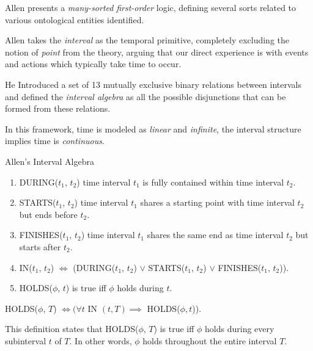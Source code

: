 Allen presents a \textit{many-sorted} \textit{first-order} logic, defining several sorts related to various ontological entities identified.

Allen takes the \textit{interval} as the temporal primitive, completely excluding the notion of \textit{point} from the theory, arguing that our direct experience
is with events and actions which typically take time to occur.

He Introduced a set of 13 mutually exclusive binary relations between intervals and
defined the \textit{interval algebra} as all the possible disjunctions that can be formed from these relations.

In this framework, time is modeled as \textit{linear} and \textit{infinite}, the interval structure implies time is \textit{continuous}.

\begin{exmp} Allen's Interval Algebra

	\begin{enumerate}
		\item DURING($t_1$, $t_2$) time interval $t_1$ is fully contained within time interval $t_2$.

		\item STARTS($t_1$, $t_2$) time interval $t_1$ shares a starting point with time interval $t_2$ but ends before $t_2$.

		\item FINISHES($t_1$, $t_2$) time interval $t_1$ shares the same end as time interval $t_2$ but starts after $t_2$.

		\item IN($t_1$, $t_2$) $\iff$ (DURING($t_1$, $t_2$) $\lor$ STARTS($t_1$, $t_2$) $\lor$ FINISHES($t_1$, $t_2$)).

		\item HOLDS(\(\phi\), \(t\)) is true iff \(\phi\) holds during \(t\).
	\end{enumerate}



	\begin{center}
		HOLDS(\(\phi\), \(T\)) \(\iff ( \forall t \) IN $ (t,T) \implies $ HOLDS($\phi, t$)).
	\end{center}

	This definition states that HOLDS($\phi$, $T$) is true iff $\phi$ holds during every subinterval $t$ of $T$. In other words, $\phi$ holds throughout the entire interval $T$.
\end{exmp}

